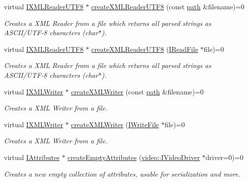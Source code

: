 \begin{DoxyCompactItemize}
virtual \hyperlink{namespaceirr_1_1io_a87616ca0bcc3d6424d2c2edfcb743193}{I\+X\+M\+L\+Reader\+U\+T\+F8} $\ast$ \hyperlink{classirr_1_1io_1_1IFileSystem_affd8f622ac7c3dcd507f20f9cd23b21f}{create\+X\+M\+L\+Reader\+U\+T\+F8} (const \hyperlink{namespaceirr_1_1io_a6468281622ce3a1c46b72e19f32dded5}{path} \&filename)=0
\begin{DoxyCompactList}\small\item\em Creates a X\+ML Reader from a file which returns all parsed strings as A\+S\+C\+I\+I/\+U\+T\+F-\/8 characters (char$\ast$). \end{DoxyCompactList}\item 
virtual \hyperlink{namespaceirr_1_1io_a87616ca0bcc3d6424d2c2edfcb743193}{I\+X\+M\+L\+Reader\+U\+T\+F8} $\ast$ \hyperlink{classirr_1_1io_1_1IFileSystem_acda42a761d3b2fb4d39ad1d9e2ada973}{create\+X\+M\+L\+Reader\+U\+T\+F8} (\hyperlink{classirr_1_1io_1_1IReadFile}{I\+Read\+File} $\ast$file)=0
\begin{DoxyCompactList}\small\item\em Creates a X\+ML Reader from a file which returns all parsed strings as A\+S\+C\+I\+I/\+U\+T\+F-\/8 characters (char$\ast$). \end{DoxyCompactList}\item 
virtual \hyperlink{classirr_1_1io_1_1IXMLWriter}{I\+X\+M\+L\+Writer} $\ast$ \hyperlink{classirr_1_1io_1_1IFileSystem_a0737712d1c90001e5765ef46912c616d}{create\+X\+M\+L\+Writer} (const \hyperlink{namespaceirr_1_1io_a6468281622ce3a1c46b72e19f32dded5}{path} \&filename)=0
\begin{DoxyCompactList}\small\item\em Creates a X\+ML Writer from a file. \end{DoxyCompactList}\item 
virtual \hyperlink{classirr_1_1io_1_1IXMLWriter}{I\+X\+M\+L\+Writer} $\ast$ \hyperlink{classirr_1_1io_1_1IFileSystem_ac2bcaf8c338e80ff579061b7056c06da}{create\+X\+M\+L\+Writer} (\hyperlink{classirr_1_1io_1_1IWriteFile}{I\+Write\+File} $\ast$file)=0
\begin{DoxyCompactList}\small\item\em Creates a X\+ML Writer from a file. \end{DoxyCompactList}\item 
virtual \hyperlink{classirr_1_1io_1_1IAttributes}{I\+Attributes} $\ast$ \hyperlink{classirr_1_1io_1_1IFileSystem_a50f91cd88b926751367dac153c1cefd2}{create\+Empty\+Attributes} (\hyperlink{classirr_1_1video_1_1IVideoDriver}{video\+::\+I\+Video\+Driver} $\ast$driver=0)=0
\begin{DoxyCompactList}\small\item\em Creates a new empty collection of attributes, usable for serialization and more. \end{DoxyCompactList}\end{DoxyCompactItemize}
